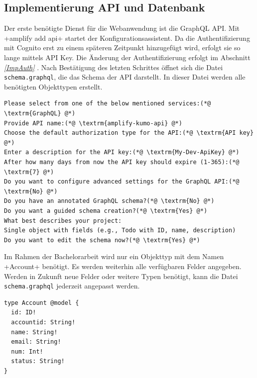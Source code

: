 \subsection{Implementierung API und Datenbank}
Der erste benötigte Dienst für die Webanwendung ist die GraphQL API.
Mit \spverb+amplify add api+ startet der Konfigurationsassistent.
Da die Authentifizierung mit Cognito erst zu einem späteren Zeitpunkt hinzugefügt wird, erfolgt sie so lange mittels API Key.
Die Änderung der Authentifizierung erfolgt im Abschnitt \textit{\ref{ImpAuth} }.
Nach Bestätigung des letzten Schrittes öffnet sich die Datei \verb+schema.graphql+, die das Schema der API darstellt.
In dieser Datei werden alle benötigten Objekttypen erstellt.
\\
\begin{lstlisting}[basicstyle=\ttfamily\small, breaklines=true , frame = single, backgroundcolor=\color{flashwhite} ]
Please select from one of the below mentioned services:(*@ \textrm{GraphQL} @*)
Provide API name:(*@ \textrm{amplify-kumo-api} @*)
Choose the default authorization type for the API:(*@ \textrm{API key} @*)
Enter a description for the API key:(*@ \textrm{My-Dev-ApiKey} @*)
After how many days from now the API key should expire (1-365):(*@ \textrm{7} @*)
Do you want to configure advanced settings for the GraphQL API:(*@ \textrm{No} @*)
Do you have an annotated GraphQL schema?(*@ \textrm{No} @*)
Do you want a guided schema creation?(*@ \textrm{Yes} @*)
What best describes your project:
Single object with fields (e.g., Todo with ID, name, description)
Do you want to edit the schema now?(*@ \textrm{Yes} @*)
\end{lstlisting}

Im Rahmen der Bachelorarbeit wird nur ein Objekttyp mit dem Namen \spverb+Account+ benötigt.
Es werden weiterhin alle verfügbaren Felder angegeben.
Werden in Zukunft neue Felder oder weitere Typen benötigt, kann die Datei \verb+schema.graphql+ jederzeit angepasst werden.
\\
\begin{lstlisting}[basicstyle=\ttfamily\small, breaklines=true , frame = single, backgroundcolor=\color{flashwhite} ]
type Account @model {
  id: ID!
  accountid: String!
  name: String!
  email: String!
  num: Int!
  status: String!
}

\end{lstlisting}

